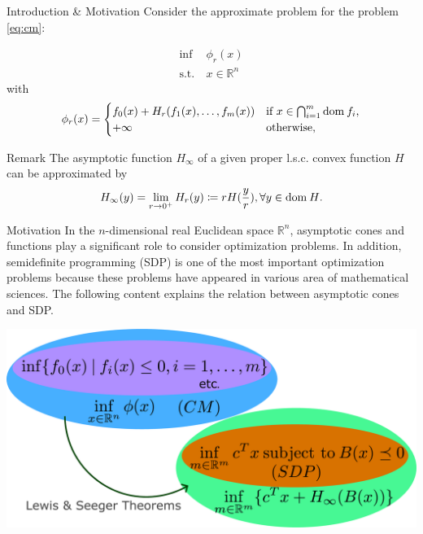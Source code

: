 \documentclass[aspectratio=169, dvipdfmx, 11pt]{beamer}
\newcommand{\NDemenstionalRealEuclideanSpace}{\mathbb{R}^n}
\newcommand{\Domain}[1]{\text{\rm dom\:${#1}$}} %
\begin{document}
\begin{frame}{Introduction \& Motivation}
  Consider the approximate problem for the problem \eqref{eq:cm}:

  \begin{equation}
    \begin{aligned}
      \inf \:& \phi_r(x) \\
      \text{s.t.} \:& x \in \NDemenstionalRealEuclideanSpace
    \end{aligned} \tag{CMr} \label{eq:cmr}
  \end{equation}
  with
  \begin{equation}
    \phi_r(x)=
    \begin{cases}
      f_0 (x) + H_r (f_1(x), \ldots, f_m(x)) & \text{if $x \in \bigcap_{i =1}^{m} \Domain{f_i}$,} \\
      +\infty      & \text{otherwise,} \notag
    \end{cases}
  \end{equation}

  \begin{alertblock}{Remark}
    The asymptotic function $H_\infty$ of a given proper l.s.c. convex function $H$ can be approximated by
    \begin{equation}
      H_{\infty}(y) = \lim_{r \to 0^+} H_r(y) \coloneqq  rH(\frac{y}{r}), \forall y \in \Domain{H}. \notag
    \end{equation}
  \end{alertblock}
\end{frame}

\begin{frame}{Motivation}
In the $n$-dimensional real Euclidean space $\NDemenstionalRealEuclideanSpace$, asymptotic cones and functions play a significant role to consider optimization problems. In addition, semidefinite programming (SDP) is one of the most important optimization problems because these problems have appeared in various area of mathematical sciences. The following content explains the relation between asymptotic cones and SDP.
\bigskip

\centering
\includegraphics[keepaspectratio, scale=0.105]{figures/summary_of_presentation.eps}
\end{frame}
\end{document}
